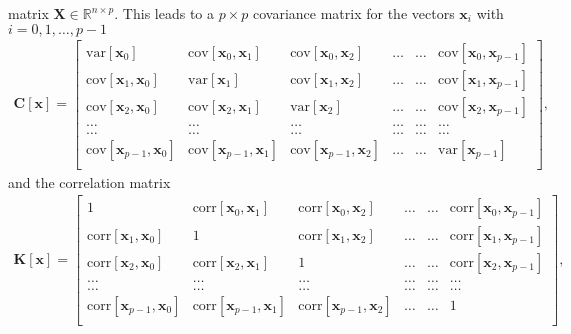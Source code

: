 \documentclass[letterpaper,10pt,english]{sphinxmanual}
\begin{document}
matrix \(\boldsymbol{X}\in {\mathbb{R}}^{n\times p}\). This leads to a \(p\times p\)
covariance matrix for the vectors \(\boldsymbol{x}_i\) with \(i=0,1,\dots,p-1\)
\begin{equation*}
\begin{split}
\boldsymbol{C}[\boldsymbol{x}] = \begin{bmatrix}
\mathrm{var}[\boldsymbol{x}_0] & \mathrm{cov}[\boldsymbol{x}_0,\boldsymbol{x}_1]  & \mathrm{cov}[\boldsymbol{x}_0,\boldsymbol{x}_2] & \dots & \dots & \mathrm{cov}[\boldsymbol{x}_0,\boldsymbol{x}_{p-1}]\\
\mathrm{cov}[\boldsymbol{x}_1,\boldsymbol{x}_0] & \mathrm{var}[\boldsymbol{x}_1]  & \mathrm{cov}[\boldsymbol{x}_1,\boldsymbol{x}_2] & \dots & \dots & \mathrm{cov}[\boldsymbol{x}_1,\boldsymbol{x}_{p-1}]\\
\mathrm{cov}[\boldsymbol{x}_2,\boldsymbol{x}_0]   & \mathrm{cov}[\boldsymbol{x}_2,\boldsymbol{x}_1] & \mathrm{var}[\boldsymbol{x}_2] & \dots & \dots & \mathrm{cov}[\boldsymbol{x}_2,\boldsymbol{x}_{p-1}]\\
\dots & \dots & \dots & \dots & \dots & \dots \\
\dots & \dots & \dots & \dots & \dots & \dots \\
\mathrm{cov}[\boldsymbol{x}_{p-1},\boldsymbol{x}_0]   & \mathrm{cov}[\boldsymbol{x}_{p-1},\boldsymbol{x}_1] & \mathrm{cov}[\boldsymbol{x}_{p-1},\boldsymbol{x}_{2}]  & \dots & \dots  & \mathrm{var}[\boldsymbol{x}_{p-1}]\\
\end{bmatrix},
\end{split}
\end{equation*}
and the correlation matrix
\begin{equation*}
\begin{split}
\boldsymbol{K}[\boldsymbol{x}] = \begin{bmatrix}
1 & \mathrm{corr}[\boldsymbol{x}_0,\boldsymbol{x}_1]  & \mathrm{corr}[\boldsymbol{x}_0,\boldsymbol{x}_2] & \dots & \dots & \mathrm{corr}[\boldsymbol{x}_0,\boldsymbol{x}_{p-1}]\\
\mathrm{corr}[\boldsymbol{x}_1,\boldsymbol{x}_0] & 1  & \mathrm{corr}[\boldsymbol{x}_1,\boldsymbol{x}_2] & \dots & \dots & \mathrm{corr}[\boldsymbol{x}_1,\boldsymbol{x}_{p-1}]\\
\mathrm{corr}[\boldsymbol{x}_2,\boldsymbol{x}_0]   & \mathrm{corr}[\boldsymbol{x}_2,\boldsymbol{x}_1] & 1 & \dots & \dots & \mathrm{corr}[\boldsymbol{x}_2,\boldsymbol{x}_{p-1}]\\
\dots & \dots & \dots & \dots & \dots & \dots \\
\dots & \dots & \dots & \dots & \dots & \dots \\
\mathrm{corr}[\boldsymbol{x}_{p-1},\boldsymbol{x}_0]   & \mathrm{corr}[\boldsymbol{x}_{p-1},\boldsymbol{x}_1] & \mathrm{corr}[\boldsymbol{x}_{p-1},\boldsymbol{x}_{2}]  & \dots & \dots  & 1\\
\end{bmatrix},
\end{split}
\end{equation*}
\end{document}
